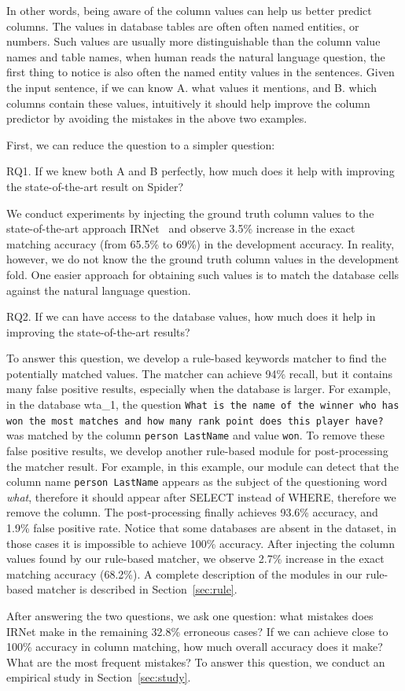In other words, being aware of the column values can help us better predict columns. The values in database tables are often often named entities, or numbers. Such values are usually more distinguishable than the column value names and table names, when human reads the natural language question, the first thing to notice is also often the named entity values in the sentences. Given the input sentence, if we can know A. what values it mentions, and B. which columns contain these values, intuitively it should help improve the column predictor by avoiding the mistakes in the above two examples. 

First, we can reduce the question to a simpler question:

RQ1. If we knew both A and B perfectly, how much does it help with improving the state-of-the-art result on Spider?

We conduct experiments by injecting the ground truth column values to the state-of-the-art approach IRNet~\cite{guo2019towards} and observe 3.5\% increase in the exact matching accuracy (from 65.5\% to 69\%) in the development accuracy. In reality, however, we do not know the the ground truth column values in the development fold. One easier approach for obtaining such values is to match the database cells against the natural language question. 

RQ2. If we can have access to the database values, how much does it help in improving the state-of-the-art results?

To answer this question, we develop a rule-based keywords matcher to find the potentially matched values. The matcher can achieve 94\% recall, but it contains many false positive results, especially when the database is larger. For example, in the database wta\_1, the question \texttt{What is the name of the winner who has won the most matches and how many rank point does this player have?} was matched by the column \texttt{person LastName} and value \texttt{won}. To remove these false positive results, we develop another rule-based module for post-processing the matcher result. For example, in this example, our module can detect that the column name \texttt{person LastName} appears as the subject of the questioning word \emph{what}, therefore it should appear after SELECT instead of WHERE, therefore we remove the column. The post-processing finally achieves 93.6\% accuracy, and 1.9\% false positive rate. Notice that some databases are absent in the dataset, in those cases it is impossible to achieve 100\% accuracy. After injecting the column values found by our rule-based matcher, we observe 2.7\% increase in the exact matching accuracy (68.2\%). A complete description of the modules in our rule-based matcher is described in Section~\ref{sec:rule}. 

After answering the two questions, we ask one question: what mistakes does IRNet make in the remaining 32.8\% erroneous cases? If we can achieve close to 100\% accuracy in column matching, how much overall accuracy does it make? What are the most frequent mistakes? To answer this question, we conduct an empirical study in Section~\ref{sec:study}. 




